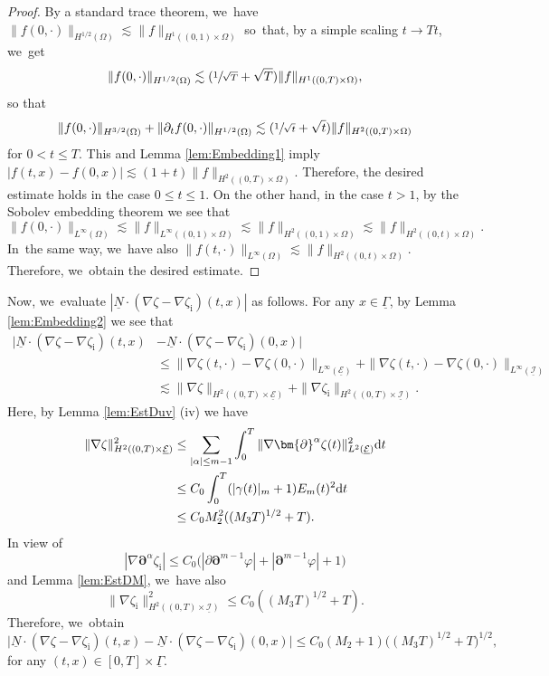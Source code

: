 \documentclass[JEP,XML,SOM,Unicode,NoFloatCountersInSection,published]{cedram}
\newcommand{\dt}{\partial_t}
\newcommand{\cI}{{\mathcal I}}
\newcommand{\cE}{{\mathcal E}}
\newcommand{\ul}[1]{\underline{#1}}
\newcommand{\itGamma}{\mathit{\Gamma}}
\theoremstyle{definition}
\begin{document}
\begin{proof}
By a standard trace theorem, we~have $\|f(0,\cdot)\|_{H^{1/2}(\Omega)} \lesssim \|f\|_{H^1((0,1)\times\Omega)}$ so~that, by a simple scaling $t\to Tt$, we~get
\[
\|f(0,\cdot)\|_{H^{1/2}(\Omega)} \lesssim (\sfrac{1}{\sqrt{T}}+\sqrt{T})\|f\|_{H^1((0,T)\times\Omega)},
\]
so that
\[
\|f(0,\cdot)\|_{H^{3/2}(\Omega)} + \|\dt f(0,\cdot)\|_{H^{1/2}(\Omega)} \lesssim (\sfrac{1}{\sqrt{t}}+\sqrt{t})\|f\|_{H^2((0,T)\times\Omega)}
\]
for $0<t\leq T$.
This and Lemma \ref{lem:Embedding1} imply $|f(t,x)-f(0,x)|\lesssim (1+t) \|f\|_{H^2((0,T)\times\Omega)}$.
Therefore, the desired estimate holds in the case $0\leq t\leq1$.
On the other hand, in the case $t>1$, by the Sobolev embedding theorem we see that
\[
\|f(0,\cdot)\|_{L^\infty(\Omega)} \lesssim \|f\|_{L^\infty((0,1)\times\Omega)} \lesssim \|f\|_{H^2((0,1)\times\Omega)} \lesssim \|f\|_{H^2((0,t)\times\Omega)}.
\]
In~the same way, we~have also $\|f(t,\cdot)\|_{L^\infty(\Omega)}\lesssim \|f\|_{H^2((0,t)\times\Omega)}$.
Therefore, we~obtain the desired estimate.
\end{proof}

Now, we~evaluate $|\ul{N}\cdot(\nabla\zeta-\nabla\zeta_\mathrm{i})(t,x)|$ as follows.
For any $x\in\ul{\itGamma}$, by Lemma \ref{lem:Embedding2} we see that
\begin{align*}
\bigl|\ul{N}\cdot(\nabla\zeta-\nabla\zeta_\mathrm{i})(t,x)&-\ul{N}\cdot(\nabla\zeta-\nabla\zeta_\mathrm{i})(0,x)\bigr| \\
&\leq \|\nabla\zeta(t,\cdot)-\nabla\zeta(0,\cdot)\|_{L^\infty(\ul{\cE})} + \|\nabla\zeta(t,\cdot)-\nabla\zeta(0,\cdot)\|_{L^\infty(\ul{\cI})} \\
&\lesssim \|\nabla\zeta\|_{H^2((0,T)\times\ul{\cE})} + \|\nabla\zeta_\mathrm{i}\|_{H^2((0,T)\times\ul{\cI})}.
\end{align*}
Here, by Lemma \ref{lem:EstDuv} (iv) we have
\begin{align*}
\|\nabla\zeta\|_{H^2((0,T)\times\ul{\cE})}^2
&\leq \sum_{|\alpha|\leq m-1}\int_0^T\|\nabla\bm{\partial}^\alpha\zeta(t)\|_{L^2(\ul{\cE})}^2 {\rm d}t \\
&\leq C_0\int_0^T(|\gamma(t)|_m+1)E_m(t)^2 {\rm d}t \\
&\leq C_0M_2^2((M_3T)^{1/2}+T).
\end{align*}
In view of
\[
|\nabla\bm{\partial}^\alpha\zeta_\mathrm{i}| \leq C_0\bigl(|\partial\bm{\partial}^{m-1}\varphi|+|\bm{\partial}^{m-1}\varphi|+1\bigr)
\]
and Lemma \ref{lem:EstDM}, we~have also
\[
\|\nabla\zeta_\mathrm{i}\|_{H^2((0,T)\times\ul{\cI})}^2 \leq C_0((M_3T)^{1/2}+T).
\]
Therefore, we~obtain
\begin{equation}\label{TransCond2}
\bigl|\ul{N}\cdot(\nabla\zeta-\nabla\zeta_\mathrm{i})(t,x)-\ul{N}\cdot(\nabla\zeta-\nabla\zeta_\mathrm{i})(0,x)\bigr|
\leq C_0(M_2+1)\bigl((M_3T)^{1/2}+T\bigr)^{1/2},
\end{equation}
for any $(t,x)\in[0,T]\times\ul{\itGamma}$.
\end{document}
